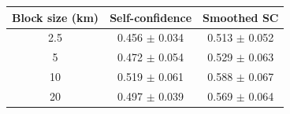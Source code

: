 \begin{tabular}{c cc}
\toprule
Block size (km) & Self-confidence & Smoothed SC \\
\midrule
2.5 & 0.456 $\pm$ 0.034 & 0.513 $\pm$ 0.052 \\
5 & 0.472 $\pm$ 0.054 & 0.529 $\pm$ 0.063 \\
10 & 0.519 $\pm$ 0.061 & 0.588 $\pm$ 0.067 \\
20 & 0.497 $\pm$ 0.039 & 0.569 $\pm$ 0.064 \\
\bottomrule
\end{tabular}